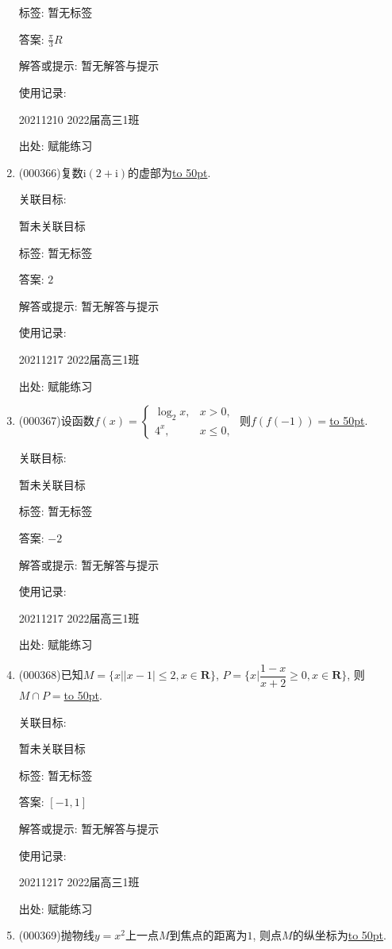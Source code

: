 \documentclass[10pt,a4paper]{article}
\newcommand{\blank}[1]{\underline{\hbox to #1pt{}}}
\begin{document}
\begin{enumerate}[1.]
标签: 暂无标签

答案: $\frac{\pi }3R$

解答或提示: 暂无解答与提示

使用记录:

20211210	2022届高三1班	


出处: 赋能练习
\item { (000366)}复数$\mathrm{i}(2+\mathrm{i})$的虚部为\blank{50}.


关联目标:

暂未关联目标



标签: 暂无标签

答案: $2$

解答或提示: 暂无解答与提示

使用记录:

20211217	2022届高三1班	


出处: 赋能练习
\item { (000367)}设函数$f(x)=\begin{cases}\log_2 x, & x>0, \\ 4^x, & x\le 0,\end{cases}$ 则$f(f(-1))=$\blank{50}.


关联目标:

暂未关联目标



标签: 暂无标签

答案: $-2$

解答或提示: 暂无解答与提示

使用记录:

20211217	2022届高三1班	


出处: 赋能练习
\item { (000368)}已知$M=\{x||x-1|\le 2,x\in \mathbf{R}\}$, $P=\{x|\dfrac{1-x}{x+2}\ge 0,x\in \mathbf{R}\}$, 则$M\cap P=$\blank{50}.


关联目标:

暂未关联目标



标签: 暂无标签

答案: $[-1,1]$

解答或提示: 暂无解答与提示

使用记录:

20211217	2022届高三1班	


出处: 赋能练习
\item { (000369)}抛物线$y=x^2$上一点$M$到焦点的距离为$1$, 则点$M$的纵坐标为\blank{50}.



\end{enumerate}
\end{document}
